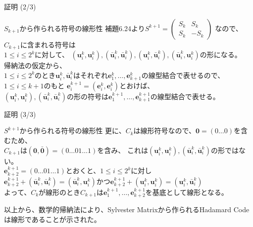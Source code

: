 \documentclass[dvipdfmx,10pt,jsarticle]{beamer}
\begin{document}
  \begin{frame}{証明 (2/3)}
    \begin{block}{$S_{k+1}$から作られる符号の線形性}
      補題6.24より$S^{k+1} = \begin{pmatrix}
        S_k & S_k \\ 
        S_k & - S_k
      \end{pmatrix}$
      なので、$C_{k+1}$に含まれる符号は\\
      $1 \leq i \leq 2^k$に対して、 $(\mathbf{u}^k_i , \mathbf{u}^k_i), (\bar{\mathbf{u}}^k_i, \bar{\mathbf{u}}^k_i), (\mathbf{u}^k_i, \bar{\mathbf{u}}^k_i), (\bar{\mathbf{u}}^k_i, \mathbf{u}^k_i)$の形になる。\\
      帰納法の仮定から、 \\
      $1 \leq i \leq 2^k$のとき$\mathbf{u}^k_i, \bar{\mathbf{u}}^k_i$はそれぞれ$\mathbf{e}^k_1, \ldots, \mathbf{e}^k_{k+1}$の線型結合で表せるので、\\
      $1 \leq i \leq k + 1$のもと $\mathbf{e}^{k+1}_i = ( \mathbf{e}^k_i, \mathbf{e}^k_i )$とおけば、\\
      $(\mathbf{u}^k_i , \mathbf{u}^k_i), (\bar{\mathbf{u}}^k_i, \bar{\mathbf{u}}^k_i)$の形の符号は$\mathbf{e}^{k+1}_1, \ldots, \mathbf{e}^{k+1}_{k+1}$の線型結合で表せる。\\
    \end{block}
  \end{frame}

  \begin{frame}{証明 (3/3)}
    \begin{block}{$S^{k+1}$から作られる符号の線形性}
      更に、$C_k$は線形符号なので、$\mathbf{0} = ( 0 \ldots 0 )$を含むため、\\
      $C_{k+1}$は$(\mathbf{0}, \bar{\mathbf{0}}) = (0\ldots01\ldots 1)$を含み、
      これは$(\mathbf{u}^k_i , \mathbf{u}^k_i), (\bar{\mathbf{u}}^k_i, \bar{\mathbf{u}}^k_i)$の形ではない。\\
      $\mathbf{e}^{k+1}_{k+2} = (0\ldots 01 \ldots 1)$とおくと、$1 \leq i \leq 2^k$に対し \\
      $\mathbf{e}^{k+1}_{k+2} + (\bar{\mathbf{u}}^k_i, \bar{\mathbf{u}}^k_i) = (\bar{\mathbf{u}}^k_i, \mathbf{u}^k_i)$かつ$\mathbf{e}^{k+1}_{k+2} + (\mathbf{u}^k_i, \mathbf{u}^k_i) = (\mathbf{u}^k_i, \bar{\mathbf{u}}^k_i)$\\
      よって、$C_k$が線形のとき$C_{k+1}$は$\mathbf{e}^{k+1}_1 , \ldots, \mathbf{e}^{k+1}_{k+2}$を基底として線形となる。
    \end{block}
    
    以上から、数学的帰納法により、Sylvester Matrixから作られるHadamard Codeは線形であることが示された。
  \end{frame}
\end{document}
